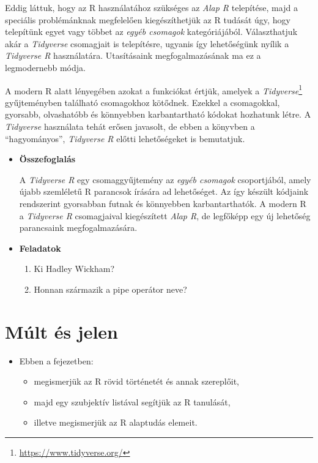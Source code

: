 \documentclass[
]{book}
\DeclareRobustCommand{\href}[2]{#2\footnote{\url{#1}}}
\providecommand{\tightlist}{%
  \setlength{\itemsep}{0pt}\setlength{\parskip}{0pt}}
\newenvironment{rmdblock}[1]
  {\begin{shaded*}
  \begin{itemize}
  \renewcommand{\labelitemi}{
    \raisebox{-.7\height}[0pt][0pt]{
      {\setkeys{Gin}{width=3em,keepaspectratio}\texttt{[image: images/\#1]}}
    }
  }
  \item
  }
  {
  \end{itemize}
  \end{shaded*}
  }
\newenvironment{rmdlevel3}
  {\begin{rmdblock}{level3}}
  {\end{rmdblock}}
\newenvironment{rmdsummary}
  {\begin{rmdblock}{summary}}
  {\end{rmdblock}}
\newenvironment{rmdexercise}
  {\begin{rmdblock}{exercise}}
  {\end{rmdblock}}
\begin{document}
Eddig láttuk, hogy az R használatához szükséges az \emph{Alap R} telepítése, majd a speciális problémánknak megfelelően kiegészíthetjük az R tudását úgy, hogy telepítünk egyet vagy többet az \emph{egyéb csomagok} kategóriájából. Választhatjuk akár a \emph{Tidyverse} csomagjait is telepítésre, ugyanis így lehetőségünk nyílik a \emph{Tidyverse R} használatára. Utasításaink megfogalmazásának ma ez a legmodernebb módja.

A modern R alatt lényegében azokat a funkciókat értjük, amelyek a \href{https://www.tidyverse.org/}{\emph{Tidyverse}} gyűjteményben található csomagokhoz kötődnek. Ezekkel a csomagokkal, gyorsabb, olvashatóbb és könnyebben karbantartható kódokat hozhatunk létre. A \emph{Tidyverse} használata tehát erősen javasolt, de ebben a könyvben a ``hagyományos'', \emph{Tidyverse R} előtti lehetőségeket is bemutatjuk.

\begin{rmdsummary}
\textbf{Összefoglalás}

A \emph{Tidyverse R} egy csomaggyűjtemény az \emph{egyéb csomagok}
csoportjából, amely újabb szemléletű R parancsok írására ad lehetőséget.
Az így készült kódjaink rendszerint gyorsabban futnak és könnyebben
karbantarthatók. A modern R a \emph{Tidyverse R} csomagjaival
kiegészített \emph{Alap R}, de legfőképp egy új lehetőség parancsaink
megfogalmazására.
\end{rmdsummary}

\begin{rmdexercise}
\textbf{Feladatok}

\begin{enumerate}
\def\labelenumi{\arabic{enumi}.}
\tightlist
\item
  Ki Hadley Wickham?
\item
  Honnan származik a pipe operátor neve?
\end{enumerate}
\end{rmdexercise}

\hypertarget{muxfalt-uxe9s-jelen}{%
\section{Múlt és jelen}\label{muxfalt-uxe9s-jelen}}

\begin{rmdlevel3}
Ebben a fejezetben:

\begin{itemize}
\tightlist
\item
  megismerjük az R rövid történetét és annak szereplőit,
\item
  majd egy szubjektív listával segítjük az R tanulását,
\item
  illetve megismerjük az R alaptudás elemeit.
\end{itemize}
\end{rmdlevel3}
\end{document}

